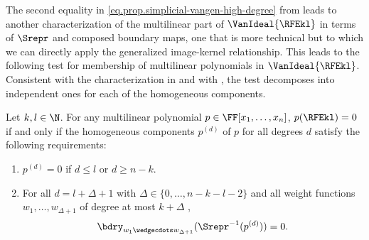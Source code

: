 The second equality in \eqref{eq.prop.simplicial-vangen-high-degree} from  leads to another characterization of the multilinear part of $\VanIdeal{\RFEkl}$ in terms of $\Srepr$ and composed boundary maps, one that is more technical but to which we can directly apply the generalized image-kernel relationship. This leads to the following test for membership of multilinear polynomials in $\VanIdeal{\RFEkl}$. Consistent with the characterization in  and with , the test decomposes into independent ones for each of the homogeneous components.

\begin{theorem}
  \label{thm.vanideal-char.multilinear}
  Let \(k,l \in \N\).
  For any multilinear polynomial
  \(p\in\FF[x_1,\ldots,x_n]\),
  \(p(\RFEkl) = 0\) if and only if the homogeneous components $p^{(d)}$ of $p$ for all degrees $d$ satisfy the following requirements:
  \begin{enumerate}
      \item $p^{(d)}=0$ if $d \le l$ or $d \ge n-k$. \label{cond.thm.vanideal-char.multilinear-1}
      \item For all $d = l+\Delta+1$ with $\Delta \in \{0, \dots, n-k-l-2\}$ and all weight functions \(w_1,\ldots,w_{\Delta+1}\) of degree at most \(k+\Delta\) \label{cond.thm.vanideal-char.multilinear-2},
      \begin{equation}\label{eq.thm.vanideal-char.multilinear}
      \bdry_{w_1\wedgecdots w_{\Delta+1}}( \Srepr^{-1}(p^{(d)})  ) = 0.
      \end{equation}
  \end{enumerate}
\end{theorem}

